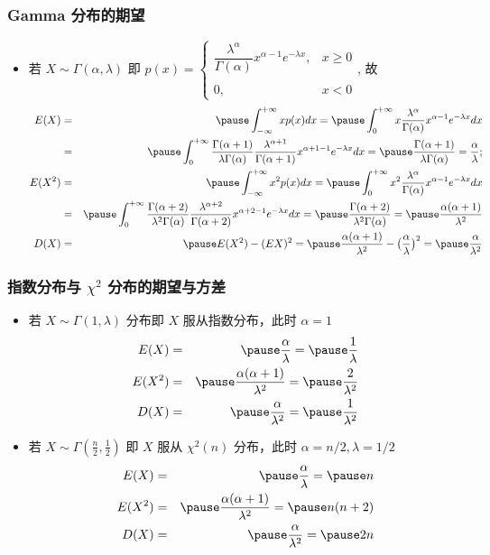 	\begin{frame}
		\frametitle{Gamma 分布的期望}
		\begin{itemize}[<+-|alert@+>]
			\item 若 $X\sim \Gamma (\alpha,\lambda)$ 即 $p (x)=\left\{\begin{array}{ll}
				\dfrac{\lambda^\alpha}{\Gamma(\alpha)}x^{\alpha-1}e^{-\lambda x}, & x\ge 0\\
				\\
				0, &x<0
			\end{array}\right.$, 故 \pause
			{\small\begin{eqnarray*}
					E(X)&=&\pause \int_{-\infty}^{+\infty}xp(x)dx=\pause \int_0^{+\infty}x\dfrac{\lambda^\alpha}{\Gamma(\alpha)}x^{\alpha-1}e^{-\lambda x}dx\\
					&=&\pause \int_0^{+\infty}\dfrac{\Gamma(\alpha+1)}{\lambda\Gamma(\alpha)}\dfrac{\lambda^{\alpha+1}}{\Gamma(\alpha+1)}x^{\alpha+1-1}e^{-\lambda x}dx=\pause \dfrac{\Gamma(\alpha+1)}{\lambda\Gamma(\alpha)}=\dfrac{\alpha}{\lambda};\\
					E(X^2)&=&\pause \int_{-\infty}^{+\infty}x^2p(x)dx=\pause \int_0^{+\infty}x^2\dfrac{\lambda^\alpha}{\Gamma(\alpha)}x^{\alpha-1}e^{-\lambda x}dx\\
					&=&\pause \int_0^{+\infty}\dfrac{\Gamma(\alpha+2)}{\lambda^2\Gamma(\alpha)}\dfrac{\lambda^{\alpha+2}}{\Gamma(\alpha+2)}x^{\alpha+2-1}e^{-\lambda x}dx=\pause \dfrac{\Gamma(\alpha+2)}{\lambda^2\Gamma(\alpha)}=\pause \dfrac{\alpha(\alpha+1)}{\lambda^2}\\
					D(X)&=&\pause E(X^2)-(EX)^2=\pause \dfrac{\alpha(\alpha+1)}{\lambda^2}-\big(\dfrac{\alpha}{\lambda}\big)^2=\pause \dfrac{\alpha}{\lambda^2}
			\end{eqnarray*}}

		\end{itemize}
	\end{frame}
	\begin{frame}
		\frametitle{指数分布与 $\chi^2$ 分布的期望与方差}
		\begin{itemize}[<+-|alert@+>]
			\item 若 $X\sim \Gamma (1,\lambda)$ 分布即 $X$ 服从指数分布，此时 $\alpha=1$
			\begin{eqnarray*}
				E(X)&=&\pause \dfrac{\alpha}{\lambda}=\pause \dfrac{1}{\lambda}\\
				E(X^2)&=&\pause \dfrac{\alpha(\alpha+1)}{\lambda^2}=\pause \dfrac{2}{\lambda^2}\\
				D(X)&=&\pause \dfrac{\alpha}{\lambda^2}=\pause \dfrac{1}{\lambda^2}
			\end{eqnarray*}


			\item 若 $X\sim \Gamma (\frac{n}{2},\frac{1}{2})$ 即 $X$ 服从 $\chi^2 (n)$ 分布，此时 $\alpha=n/2, \lambda=1/2$  \begin{eqnarray*}
				E(X)&=&\pause \dfrac{\alpha}{\lambda}=\pause n\\
				E(X^2)&=&\pause \dfrac{\alpha(\alpha+1)}{\lambda^2}=\pause n(n+2)\\
				D(X)&=&\pause \dfrac{\alpha}{\lambda^2}=\pause 2n
			\end{eqnarray*}
		\end{itemize}
	\end{frame}

